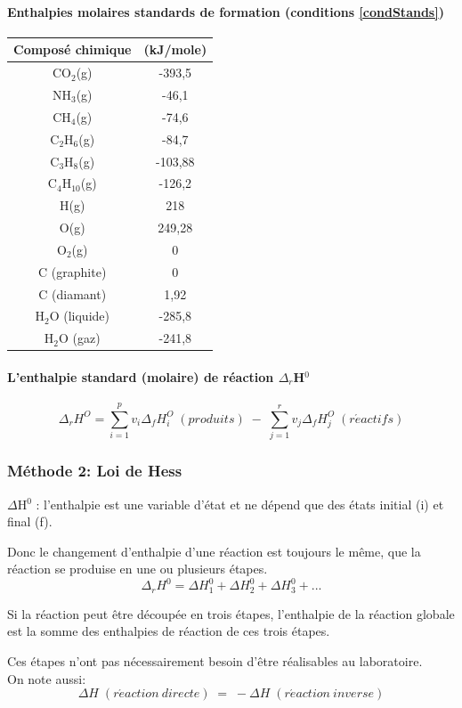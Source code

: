 \documentclass[10pt,a4paper]{book}
\begin{document}
\paragraph{Enthalpies molaires standards de formation (conditions \ref{condStands})} \label{standard_formation_enthalpy}
\begin{center}
\begin{tabular}{| c | c |}
\hline
\textbf{Composé chimique} & \textbf{(kJ/mole)} \\
\hline
CO$_2$(g) & -393,5 \\
\hline
NH$_3$(g) & -46,1 \\
\hline
CH$_4$(g) & -74,6 \\
\hline
C$_2$H$_6$(g) & -84,7 \\
\hline
C$_3$H$_8$(g) & -103,88 \\
\hline
C$_4$H$_{10}$(g) & -126,2 \\
\hline
H(g) & 218 \\
\hline
O(g) & 249,28 \\
\hline
O$_2$(g) & 0 \\
\hline
C (graphite) & 0 \\
\hline
C (diamant) & 1,92 \\
\hline
H$_2$O (liquide) & -285,8 \\
\hline
H$_2$O (gaz) & -241,8 \\
\hline
\end{tabular}
\end{center}
\paragraph{L'enthalpie standard (molaire) de réaction $\Delta_r$H$^0$}
\begin{displaymath}
\Delta_r H^O = \sum^p_{i=1}v_i\Delta_f H_i^O \; (produits) \; - \; \sum^r_{j=1}v_j\Delta_f H_j^O \; (r\acute{e}actifs)
\end{displaymath}

\subsubsection{Méthode 2: Loi de Hess}

$\Delta$H$^0$ : l'enthalpie est une variable d'état et ne dépend que des états initial (i) et final (f). \par
Donc le changement d'enthalpie d'une réaction est toujours le même, que la réaction se produise en une ou plusieurs étapes.
\begin{displaymath}
\Delta_r H^0 = \Delta H_1^0 + \Delta H_2^0 + \Delta H_3^0 +...
\end{displaymath} \par
Si la réaction peut être découpée en trois étapes, l'enthalpie
de la réaction globale est la somme des enthalpies de réaction
de ces trois étapes. \par
Ces étapes n'ont pas nécessairement besoin d'être réalisables
au laboratoire. \\
On note aussi:
\begin{displaymath}
\Delta H \; (r\acute{e}action \: directe) \; = \; - \Delta H \; (r\acute{e}action \: inverse)
\end{displaymath}
\end{document}
